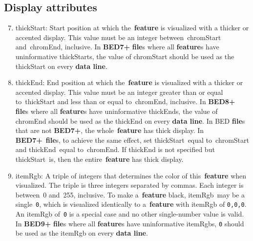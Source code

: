 \documentclass[11pt]{article}
\begin{document}
\subsection{Display attributes}
\begin{enumerate}
  \setcounter{enumi}{6}

\item \textsf{thickStart}: Start position at which the~\textbf{feature} is visualized with a thicker or accented display.
  This value must be an integer between~\textsf{chromStart} and~\textsf{chromEnd}, inclusive.
  In \textbf{BED7+} \textbf{file}s where all \textbf{feature}s have uninformative \textsf{thickStart}s, the value of \textsf{chromStart} should be used as the \textsf{thickStart} on every \textbf{data line}.

\item \textsf{thickEnd}: End position at which the~\textbf{feature} is visualized with a thicker or accented display.
  This value must be an integer greater than or equal to~\textsf{thickStart} and less than or equal to~\textsf{chromEnd}, inclusive.
  In \textbf{BED8+} \textbf{file}s where all \textbf{feature}s have uninformative \textsf{thickEnd}s, the value of \textsf{chromEnd} should be used as the \textsf{thickEnd} on every \textbf{data line}.
  In \ac{BED} \textbf{file}s that are not \textbf{BED7+}, the whole~\textbf{feature} has thick display.
  In \textbf{BED7+}~\textbf{file}s, to achieve the same effect, set \textsf{thickStart}~equal to~\textsf{chromStart} and \textsf{thickEnd}~equal to~\textsf{chromEnd}.
  If \textsf{thickEnd} is not specified but \textsf{thickStart}~is, then the entire~\textbf{feature} has thick display.

\item \textsf{itemRgb}: A triple of integers that determines the color of this~\textbf{feature} when visualized.
  The triple is three integers separated by commas.
  Each integer is between~0 and~255, inclusive.
  To make a~\textbf{feature} black, \textsf{itemRgb}~may be a single~\texttt{0}, which is visualized identically to a~\textbf{feature} with \textsf{itemRgb} of \texttt{0,0,0}.
  An \textsf{itemRgb} of~\texttt{0} is a special case and no other single-number value is valid.
  In \textbf{BED9+} \textbf{file}s where all \textbf{feature}s have uninformative \textsf{itemRgb}s, \texttt{0} should be used as the \textsf{itemRgb} on every \textbf{data line}.
\end{enumerate}
\end{document}
